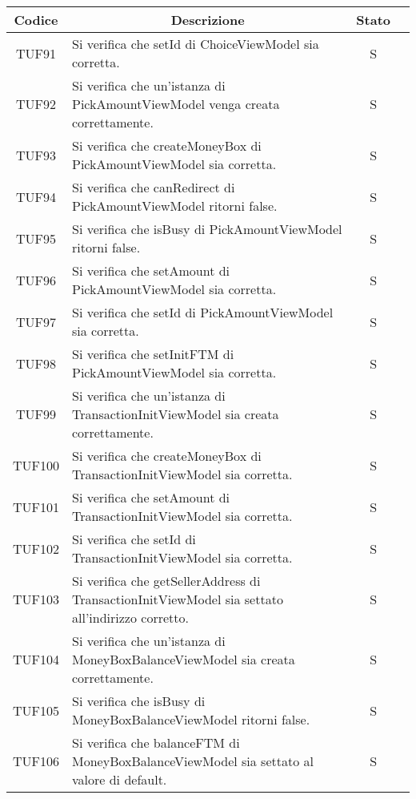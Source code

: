 \begin{table}[H]
  \centering
  \renewcommand{\arraystretch}{1.8}
  \begin{tabular}{c|p{8cm}|c|c}
    \rowcolor[HTML]{125E28}
    \color[HTML]{FFFFFF}\textbf{Codice}
          & \multicolumn{1}{c}{\color[HTML]{FFFFFF}\textbf{Descrizione}}
          & \color[HTML]{FFFFFF}\textbf{Stato}                                                                                                          \\
    \hline
    TUF91 & Si verifica che setId di ChoiceViewModel sia corretta. & S \\
    TUF92 & Si verifica che un'istanza di PickAmountViewModel venga creata correttamente. & S \\
    TUF93 & Si verifica che createMoneyBox di PickAmountViewModel sia corretta. & S \\
    TUF94 & Si verifica che canRedirect di PickAmountViewModel ritorni false. & S \\
    TUF95 & Si verifica che isBusy di PickAmountViewModel ritorni false. & S \\
    TUF96 & Si verifica che setAmount di PickAmountViewModel sia corretta. & S \\
    TUF97 & Si verifica che setId di PickAmountViewModel sia corretta. & S \\
    TUF98 & Si verifica che setInitFTM di PickAmountViewModel sia corretta. & S \\
    TUF99 & Si verifica che un'istanza di TransactionInitViewModel sia creata correttamente. & S \\
    TUF100 & Si verifica che createMoneyBox di TransactionInitViewModel sia corretta. & S \\
    TUF101 & Si verifica che setAmount di TransactionInitViewModel sia corretta. & S \\
    TUF102 & Si verifica che setId di TransactionInitViewModel sia corretta. & S \\
    TUF103 & Si verifica che getSellerAddress di TransactionInitViewModel sia settato all'indirizzo corretto. & S \\
    TUF104 & Si verifica che un'istanza di MoneyBoxBalanceViewModel sia creata correttamente. & S \\
    TUF105 & Si verifica che isBusy di MoneyBoxBalanceViewModel ritorni false. & S \\
    TUF106 & Si verifica che balanceFTM di MoneyBoxBalanceViewModel sia settato al valore di default. & S \\
  \end{tabular}
\end{table}
